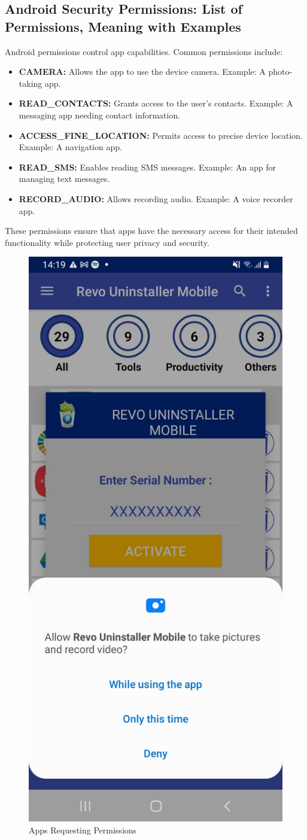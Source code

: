 \documentclass[11pt]{article}
\begin{document}
\subsection{Android Security Permissions: List of Permissions, Meaning with Examples}

Android permissions control app capabilities. Common permissions include:

\begin{itemize}
    \item \textbf{CAMERA:} Allows the app to use the device camera. Example: A photo-taking app.
    \item \textbf{READ\_CONTACTS:} Grants access to the user's contacts. Example: A messaging app needing contact information.
    \item \textbf{ACCESS\_FINE\_LOCATION:} Permits access to precise device location. Example: A navigation app.
    \item \textbf{READ\_SMS:} Enables reading SMS messages. Example: An app for managing text messages.
    \item \textbf{RECORD\_AUDIO:} Allows recording audio. Example: A voice recorder app.
\end{itemize}

These permissions ensure that apps have the necessary access for their intended functionality while protecting user privacy and security.

\begin{figure}[H]
    \centering
    \includegraphics[width=.45\textwidth]{camera permission in android/camera permission in android_9.jpg}
    \caption{Apps Requesting Permissions}
\end{figure}
\end{document}
